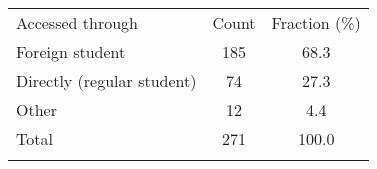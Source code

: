 \begin{center}
\begin{tabular}{lcc}
\hline \noalign{\smallskip}Accessed through & Count & Fraction (\%)\\
\noalign{\smallskip}\noalign{\smallskip}Foreign student & 185 & 68.3\\
\hline Directly (regular student) & 74 & 27.3\\
Other & 12 & 4.4\\
Total & 271 & 100.0\\
\noalign{\smallskip}\hline\end{tabular}\\
\end{center}

